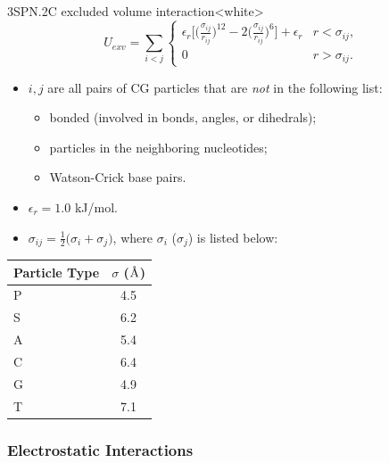 \begin{smallpage}{3SPN.2C excluded volume interaction}<white>
  \begin{equation}
    \label{eq:dna_3spn2c_nonlocal_exv}
    U_{exv} = \sum_{i<j}
    \begin{cases}\displaystyle
      \epsilon_r\bigg[ \Big(\frac{\sigma_{ij}}{r_{ij}} \Big)^{12} - 2 \Big(\frac{\sigma_{ij}}{r_{ij}} \Big)^6 \bigg]+ \epsilon_r & r < \sigma_{ij},  \\
      0 & r > \sigma_{ij}.
    \end{cases}
  \end{equation}
  \tcblower
  \begin{itemize}
  \item $i, j$ are all pairs of CG particles that are \emph{not} in the
    following list:
    \begin{itemize}
    \item bonded (involved in bonds, angles, or dihedrals);
    \item particles in the neighboring nucleotides;
    \item Watson-Crick base pairs.
    \end{itemize}
  \item $\epsilon_{r} = 1.0$ kJ/mol.
  \item $\displaystyle \sigma_{ij} = \frac{1}{2}\big( \sigma_i + \sigma_j
    \big)$, where $\sigma_i$ ($\sigma_j$) is listed below:
  \end{itemize}
  \begin{center}
    \begin{tabular}{lc}
      \toprule
      Particle Type    & $\sigma$ ($\textup{\AA}$) \\
      \midrule
      P  &  4.5 \\
      S  &  6.2 \\
      A  &  5.4 \\
      C  &  6.4 \\
      G  &  4.9 \\
      T  &  7.1 \\
      \bottomrule
    \end{tabular}
  \end{center}
\end{smallpage}



\subsubsection{Electrostatic Interactions}
\label{sec:dna_3spn2c_potential_ele}


